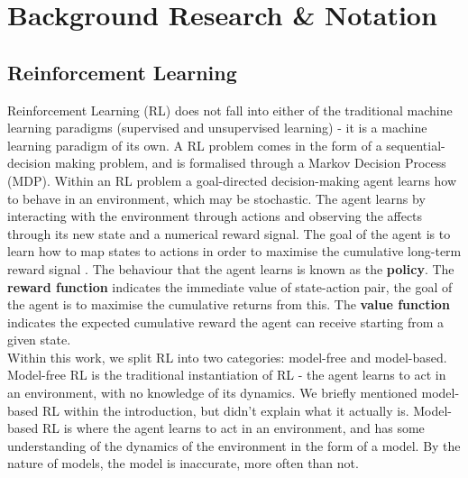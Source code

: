 \chapter{Background Research & Notation}
\label{chapter2}

\section{Reinforcement Learning}
Reinforcement Learning (RL) does not fall into either of the traditional machine learning paradigms (supervised and unsupervised learning) - it is a machine learning paradigm of its own. A RL problem comes in the form of a sequential-decision making problem, and is formalised through a Markov Decision Process (MDP). Within an RL problem a goal-directed decision-making agent learns how to behave in an environment, which may be stochastic. The agent learns by interacting with the environment through actions and observing the affects through its new state and a numerical reward signal. The goal of the agent is to learn how to map states to actions in order to maximise the cumulative long-term reward signal \cite{DBLP:books/lib/SuttonB98}. The behaviour that the agent learns is known as the \textbf{policy}. The \textbf{reward function} indicates the immediate value of state-action pair, the goal of the agent is to maximise the cumulative returns from this. The \textbf{value function} indicates the expected cumulative reward the agent can receive starting from a given state.
\\Within this work, we split RL into two categories: model-free and model-based. Model-free RL is the traditional instantiation of RL - the agent learns to act in an environment, with no knowledge of its dynamics. We briefly mentioned model-based RL within the introduction, but didn't explain what it actually is. Model-based RL is where the agent learns to act in an environment, and has some understanding of the dynamics of the environment in the form of a model. By the nature of models, the model is inaccurate, more often than not.

